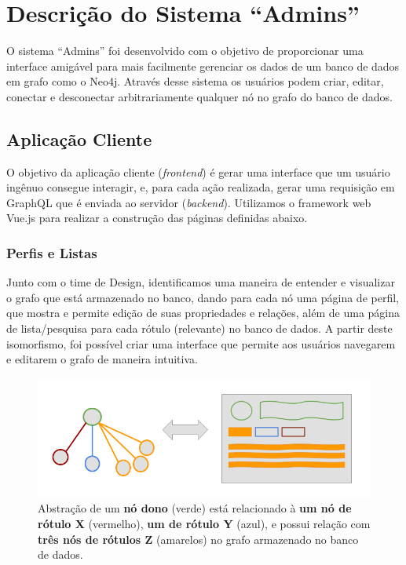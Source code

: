 \chapter{Descrição do Sistema ``Admins''}
\label{chap4}

O sistema ``Admins'' foi desenvolvido com o objetivo de proporcionar uma interface amigável para mais facilmente gerenciar os dados de um banco de dados em grafo como o Neo4j. Através desse sistema os usuários podem criar, editar, conectar e desconectar arbitrariamente qualquer nó no grafo do banco de dados.

\section{Aplicação Cliente}

O objetivo da aplicação cliente (\textit{frontend}) é gerar uma interface que um usuário ingênuo consegue interagir, e, para cada ação realizada, gerar uma requisição em GraphQL que é enviada ao servidor (\textit{backend}). Utilizamos o framework web Vue.js para realizar a construção das páginas definidas abaixo.
\subsection{Perfis e Listas}

Junto com o time de Design, identificamos uma maneira de entender e visualizar o grafo que está armazenado no banco, dando para cada nó uma página de perfil, que mostra e permite edição de suas propriedades e relações, além de uma página de lista/pesquisa para cada rótulo (relevante) no banco de dados. A partir deste isomorfismo, foi possível criar uma interface que permite aos usuários navegarem e editarem o grafo de maneira intuitiva.

\begin{figure}[H]
    \centering
    \includegraphics[width=1.0\linewidth]{Imagens/chap04/perfil-isomorfismo.png}
    \caption{Abstração de um \textbf{nó dono} (verde) está relacionado à \textbf{um nó de rótulo X} (vermelho), \textbf{um de rótulo Y} (azul), e possui relação com \textbf{três nós de rótulos Z} (amarelos) no grafo armazenado no banco de dados.}
    \label{fig:isomorphism}
\end{figure}

